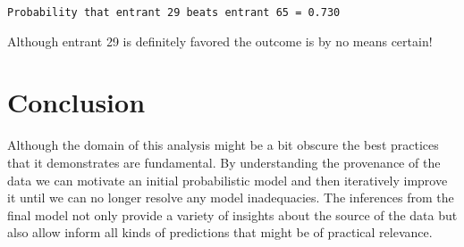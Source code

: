 \documentclass[
  letterpaper,
  DIV=11,
  numbers=noendperiod]{scrartcl}
\newenvironment{Shaded}{\begin{snugshade}}{\end{snugshade}}
\newcommand{\DecValTok}[1]{\textcolor[rgb]{0.68,0.00,0.00}{#1}}
\newcommand{\FunctionTok}[1]{\textcolor[rgb]{0.28,0.35,0.67}{#1}}
\newcommand{\NormalTok}[1]{\textcolor[rgb]{0.00,0.23,0.31}{#1}}
\newcommand{\OtherTok}[1]{\textcolor[rgb]{0.00,0.23,0.31}{#1}}
\newcommand{\SpecialCharTok}[1]{\textcolor[rgb]{0.37,0.37,0.37}{#1}}
\newcommand{\StringTok}[1]{\textcolor[rgb]{0.13,0.47,0.30}{#1}}
\begin{document}
\begin{Shaded}
\end{Shaded}

\begin{verbatim}
Probability that entrant 29 beats entrant 65 = 0.730
\end{verbatim}

Although entrant 29 is definitely favored the outcome is by no means
certain!

\section{Conclusion}\label{conclusion}

Although the domain of this analysis might be a bit obscure the best
practices that it demonstrates are fundamental. By understanding the
provenance of the data we can motivate an initial probabilistic model
and then iteratively improve it until we can no longer resolve any model
inadequacies. The inferences from the final model not only provide a
variety of insights about the source of the data but also allow inform
all kinds of predictions that might be of practical relevance.
\end{document}
